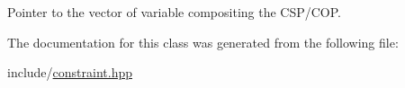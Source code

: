 Pointer to the vector of variable compositing the C\-S\-P/\-C\-O\-P. 



The documentation for this class was generated from the following file\-:\begin{DoxyCompactItemize}
\item 
include/\hyperlink{constraint_8hpp}{constraint.\-hpp}\end{DoxyCompactItemize}
